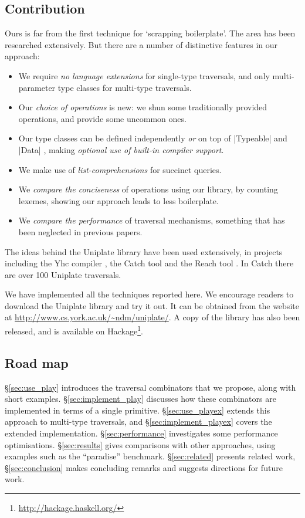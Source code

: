 \documentclass[preprint]{sigplanconf}
\let\cite=\citep
\begin{document}
\subsection{Contribution}

Ours is far from the first technique for `scrapping boilerplate'. The area has been researched extensively. But there are a number of distinctive features in our approach:

\begin{itemize}
\item We require \textit{no language extensions} for single-type traversals, and only multi-parameter type classes \citep{jones:mptc} for multi-type traversals.
\item Our \textit{choice of operations} is new: we shun some traditionally provided operations, and provide some uncommon ones.
\item Our type classes can be defined independently \textit{or} on top of |Typeable| and |Data| \citep{lammel:syb}, making \textit{optional use of built-in compiler support}.
\item We make use of \textit{list-comprehensions} \citep{wadler:list_comprehensions} for succinct queries.
\item We \textit{compare the conciseness} of operations using our library, by counting lexemes, showing our approach leads to less boilerplate.
\item We \textit{compare the performance} of traversal mechanisms, something that has been neglected in previous papers.
\end{itemize}

The ideas behind the Uniplate library have been used extensively, in projects including the Yhc compiler \citep{me:yhc_core}, the Catch tool \citep{me:catch_tfp} and the Reach tool \cite{naylor:reach}. In Catch there are over 100 Uniplate traversals.

We have implemented all the techniques reported here. We encourage readers to download the Uniplate library and try it out. It can be obtained from the website at \url{http://www.cs.york.ac.uk/~ndm/uniplate/}. A copy of the library has also been released, and is available on Hackage\footnote{\url{http://hackage.haskell.org/}}.

\subsection{Road map}

\S\ref{sec:use_play} introduces the traversal combinators that we propose, along with short examples. \S\ref{sec:implement_play} discusses how these combinators are implemented in terms of a single primitive. \S\ref{sec:use_playex} extends this approach to multi-type traversals, and \S\ref{sec:implement_playex} covers the extended implementation. \S\ref{sec:performance} investigates some performance optimisations. \S\ref{sec:results} gives comparisons with other approaches, using examples such as the ``paradise'' benchmark. \S\ref{sec:related} presents related work, \S\ref{sec:conclusion} makes concluding remarks and suggests directions for future work.
\end{document}
